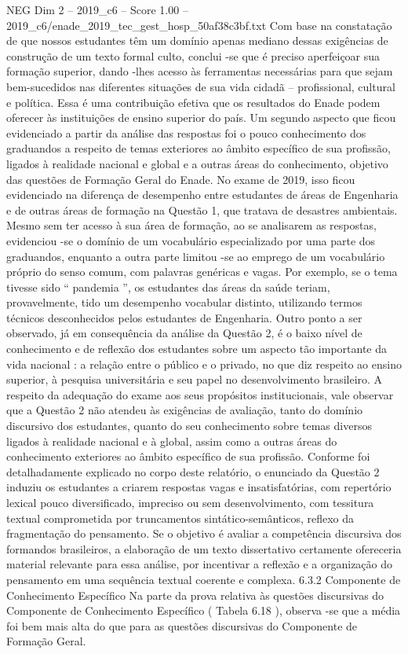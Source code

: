 \begin{textsample}{NEG Dim 2 – 2019\_c6 – Score 1.00 – 2019\_c6/enade\_2019\_tec\_gest\_hosp\_50af38c3bf.txt}
Com base na constatação de que nossos estudantes têm um domínio apenas mediano dessas exigências de construção de um texto formal culto, conclui -se que é preciso aperfeiçoar sua formação superior, dando -lhes acesso às ferramentas necessárias para que sejam bem-sucedidos nas diferentes situações de sua vida cidadã – profissional, cultural e política.
Essa é uma contribuição efetiva que os resultados do Enade podem oferecer às instituições de ensino superior do país.
Um segundo aspecto que ficou evidenciado a partir da análise das respostas foi o pouco conhecimento dos graduandos a respeito de temas exteriores ao âmbito específico de sua profissão, ligados à realidade nacional e global e a outras áreas do conhecimento, objetivo das questões de Formação Geral do Enade.
No exame de 2019, isso ficou evidenciado na diferença de desempenho entre estudantes de áreas de Engenharia e de outras áreas de formação na Questão 1, que tratava de desastres ambientais.
Mesmo sem ter acesso à sua área de formação, ao se analisarem as respostas, evidenciou -se o domínio de um vocabulário especializado por uma parte dos graduandos, enquanto a outra parte limitou -se ao emprego de um vocabulário próprio do senso comum, com palavras genéricas e vagas.
Por exemplo, se o tema tivesse sido “ pandemia ”, os estudantes das áreas da saúde teriam, provavelmente, tido um desempenho vocabular distinto, utilizando termos técnicos desconhecidos pelos estudantes de Engenharia.
Outro ponto a ser observado, já em consequência da análise da Questão 2, é o baixo nível de conhecimento e de reflexão dos estudantes sobre um aspecto tão importante da vida nacional : a relação entre o público e o privado, no que diz respeito ao ensino superior, à pesquisa universitária e seu papel no desenvolvimento brasileiro.
A respeito da adequação do exame aos seus propósitos institucionais, vale observar que a Questão 2 não atendeu às exigências de avaliação, tanto do domínio discursivo dos estudantes, quanto do seu conhecimento sobre temas diversos ligados à realidade nacional e à global, assim como a outras áreas do conhecimento exteriores ao âmbito específico de sua profissão.
Conforme foi detalhadamente explicado no corpo deste relatório, o enunciado da Questão 2 induziu os estudantes a criarem respostas vagas e insatisfatórias, com repertório lexical pouco diversificado, impreciso ou sem desenvolvimento, com tessitura textual comprometida por truncamentos sintático-semânticos, reflexo da fragmentação do pensamento.
Se o objetivo é avaliar a competência discursiva dos formandos brasileiros, a elaboração de um texto dissertativo certamente ofereceria material relevante para essa análise, por incentivar a reflexão e a organização do pensamento em uma sequência textual coerente e complexa. 6.3.2 Componente de Conhecimento Específico Na parte da prova relativa às questões discursivas do Componente de Conhecimento Específico ( Tabela 6.18 ), observa -se que a média foi bem mais alta do que para as questões discursivas do Componente de Formação Geral.

\end{textsample}
